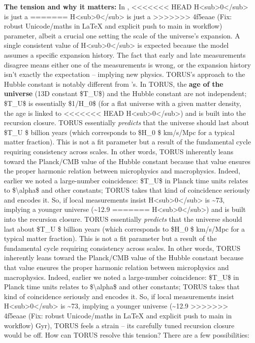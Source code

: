 \documentclass[]{article}
\begin{document}
\textbf{The tension and why it matters:} In ,
<<<<<<< HEAD
H\textless sub\textgreater0\textless/sub\textgreater{} is just a
=======
H\textless{}sub\textgreater{}0\textless{}/sub\textgreater{} is just a
>>>>>>> 4f5eaae (Fix: robust Unicode/maths in LaTeX and explicit push to main in workflow)
parameter, albeit a crucial one setting the scale of the universe's
expansion. A single consistent value of
H\textless{}sub\textgreater{}0\textless{}/sub\textgreater{} is expected
because the model assumes a specific expansion history. The fact that
early and late measurements disagree means either one of the
measurements is wrong, or the expansion history isn't exactly the 
expectation -- implying new physics. TORUS's approach to the Hubble
constant is notably different from 's. In TORUS, the \textbf{age of
the universe} (13D constant \$T\_U\$) and the Hubble constant are not
independent; \$T\_U\$ is essentially \$1/H\_0\$ (for a flat universe
with a given matter density, the age is linked to
<<<<<<< HEAD
H\textless sub\textgreater0\textless/sub\textgreater) and is built into
the recursion closure. TORUS essentially \emph{predicts} that the
universe should last about \$T\_U \$ billion years (which
corresponds to \$H\_0 \$ km/s/Mpc for a typical matter
fraction)\hspace{0pt}. This is not a fit parameter but a result of the
fundamental cycle requiring consistency across scales. In other words,
TORUS inherently leans toward the Planck/CMB value of the Hubble
constant because that value ensures the proper harmonic relation between
microphysics and macrophysics. Indeed, earlier we noted a large-number
coincidence: \$T\_U\$ in Planck time units relates to
\$\textbackslash alpha\$ and other constants; TORUS takes that kind of
coincidence seriously and encodes it. So, if local measurements insist
H\textless sub\textgreater0\textless/sub\textgreater{} is
\textasciitilde73, implying a younger universe (\textasciitilde12.9
=======
H\textless{}sub\textgreater{}0\textless{}/sub\textgreater{}) and is
built into the recursion closure. TORUS essentially \emph{predicts} that
the universe should last about \$T\_U \$ billion years (which
corresponds to \$H\_0 \$ km/s/Mpc for a typical matter fraction)​.
This is not a fit parameter but a result of the fundamental cycle
requiring consistency across scales. In other words, TORUS inherently
leans toward the Planck/CMB value of the Hubble constant because that
value ensures the proper harmonic relation between microphysics and
macrophysics. Indeed, earlier we noted a large-number coincidence:
\$T\_U\$ in Planck time units relates to \$\textbackslash{}alpha\$ and
other constants; TORUS takes that kind of coincidence seriously and
encodes it. So, if local measurements insist
H\textless{}sub\textgreater{}0\textless{}/sub\textgreater{} is
\textasciitilde{}73, implying a younger universe (\textasciitilde{}12.9
>>>>>>> 4f5eaae (Fix: robust Unicode/maths in LaTeX and explicit push to main in workflow)
Gyr), TORUS feels a strain -- its carefully tuned recursion closure
would be off​. How can TORUS resolve this tension? There are a few
possibilities:
\end{document}

